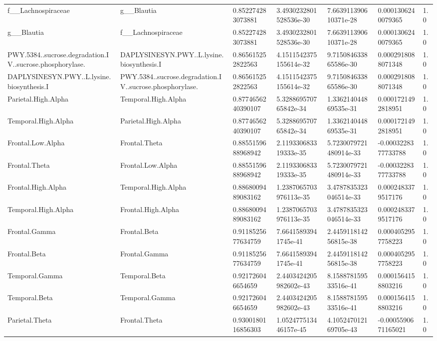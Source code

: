 \begin{longtable}{lllllll}
f\_\_Lachnospiraceae & g\_\_Blautia & 0.852274283073881 & 3.4930232801528536e-30 & 7.663911390610371e-28 & 0.0001306240079365 & 1.0 \\
g\_\_Blautia & f\_\_Lachnospiraceae & 0.852274283073881 & 3.4930232801528536e-30 & 7.663911390610371e-28 & 0.0001306240079365 & 1.0 \\
PWY.5384..sucrose.degradation.IV..sucrose.phosphorylase. & DAPLYSINESYN.PWY..L.lysine.biosynthesis.I & 0.865615252822563 & 4.1511542375155614e-32 & 9.715084633865586e-30 & 0.0002918088071348 & 1.0 \\
DAPLYSINESYN.PWY..L.lysine.biosynthesis.I & PWY.5384..sucrose.degradation.IV..sucrose.phosphorylase. & 0.865615252822563 & 4.1511542375155614e-32 & 9.715084633865586e-30 & 0.0002918088071348 & 1.0 \\
Parietal.High.Alpha & Temporal.High.Alpha & 0.8774656240390107 & 5.328869570765842e-34 & 1.336214044869535e-31 & 0.0001721492818951 & 1.0 \\
Temporal.High.Alpha & Parietal.High.Alpha & 0.8774656240390107 & 5.328869570765842e-34 & 1.336214044869535e-31 & 0.0001721492818951 & 1.0 \\
Frontal.Low.Alpha & Frontal.Theta & 0.8855159688968942 & 2.119330683319333e-35 & 5.7230079721480914e-33 & -0.0003228377733788 & 1.0 \\
Frontal.Theta & Frontal.Low.Alpha & 0.8855159688968942 & 2.119330683319333e-35 & 5.7230079721480914e-33 & -0.0003228377733788 & 1.0 \\
Frontal.High.Alpha & Temporal.High.Alpha & 0.8868009489083162 & 1.2387065703976113e-35 & 3.4787835323046514e-33 & 0.0002483379517176 & 1.0 \\
Temporal.High.Alpha & Frontal.High.Alpha & 0.8868009489083162 & 1.2387065703976113e-35 & 3.4787835323046514e-33 & 0.0002483379517176 & 1.0 \\
Frontal.Gamma & Frontal.Beta & 0.9118525677634759 & 7.66415893941745e-41 & 2.445911814256815e-38 & 0.0004052957758223 & 1.0 \\
Frontal.Beta & Frontal.Gamma & 0.9118525677634759 & 7.66415893941745e-41 & 2.445911814256815e-38 & 0.0004052957758223 & 1.0 \\
Temporal.Gamma & Temporal.Beta & 0.921726046654659 & 2.4403424205982602e-43 & 8.158878159533516e-41 & 0.0001564158803216 & 1.0 \\
Temporal.Beta & Temporal.Gamma & 0.921726046654659 & 2.4403424205982602e-43 & 8.158878159533516e-41 & 0.0001564158803216 & 1.0 \\
Parietal.Theta & Frontal.Theta & 0.9300180116856303 & 1.052477513446157e-45 & 4.105247012169705e-43 & -0.0005590671165021 & 1.0 \\

\end{longtable}
